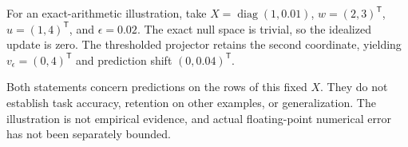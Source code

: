 For an exact-arithmetic illustration, take
\(X=\operatorname{diag}(1,0.01)\),
\(w=(2,3)^{\mathsf T}\), \(u=(1,4)^{\mathsf T}\), and
\(\epsilon=0.02\). The exact null space is trivial, so the idealized
update is zero. The thresholded projector retains the second coordinate,
yielding \(v_\epsilon=(0,4)^{\mathsf T}\) and prediction shift
\((0,0.04)^{\mathsf T}\).

Both statements concern predictions on the rows of this fixed \(X\).
They do not establish task accuracy, retention on other examples, or
generalization. The illustration is not empirical evidence, and actual
floating-point numerical error has not been separately bounded.
